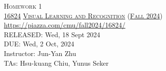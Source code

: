 \documentclass[11pt,addpoints,answers]{exam}
\title{\textsc{\hwName}} %
\author{}
\date{}
\date{}
\numberwithin{equation}{section} %
\numberwithin{figure}{section} %
\numberwithin{table}{section} %
\newcommand{\courseNum}{\href{https://visual-learning.cs.cmu.edu/}{16824}}
\newcommand{\courseName}{\href{https://visual-learning.cs.cmu.edu/}{Visual Learning and Recognition}}
\newcommand{\courseSem}{\href{https://visual-learning.cs.cmu.edu/}{Fall 2024}}
\newcommand{\courseUrl}{{\url{https://piazza.com/cmu/fall2024/16824/}}}
\newcommand{\hwNum}{Homework 1}
\newcommand{\hwTopic}{Image Classification and Object Detection}
\newcommand{\outDate}{{Wed, 18 Sept 2024}}
\newcommand{\dueDate}{{Wed, 2 Oct, 2024}}
\newcommand{\instructorName}{{Jun-Yan Zhu}}
\newcommand{\taNames}{{Hsu-kuang Chiu, Yunus Seker}}
\begin{document}
\section*{}
\begin{center}
  \textsc{\LARGE \hwNum} \\
  \vspace{1em}
  \textsc{\large \courseNum{} \courseName{} (\courseSem)} \\
  \courseUrl\\
  \vspace{1em}
  RELEASED: \outDate \\
  DUE: \dueDate \\
  Instructor: \instructorName \\
  TAs: \taNames
\end{center}
\end{document}
